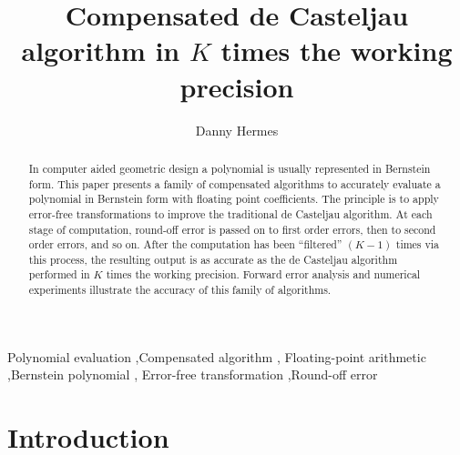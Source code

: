 \documentclass[3p, authoryear, square]{elsarticle}
\theoremstyle{definition}
\begin{document}
\hypersetup{
  urlcolor=MidnightBlue,
  linkcolor=MidnightBlue,
  citecolor=ForestGreen,
}

\begin{frontmatter}

\title{Compensated de Casteljau algorithm in \(K\) times the working precision}
\author[djh]{Danny Hermes}
\address[djh]{UC Berkeley, 970 Evans Hall \#3840, Berkeley, CA 94720-3840 USA}

\begin{abstract}
In computer aided geometric design a polynomial is usually represented in
Bernstein form. This paper presents a family of compensated algorithms to
accurately evaluate a polynomial in Bernstein form with floating point
coefficients. The principle is to apply error-free transformations to
improve the traditional de Casteljau algorithm. At each stage of computation,
round-off error is passed on to first order errors, then to second order
errors, and so on. After the computation has been ``filtered'' \((K - 1)\)
times via this process, the resulting output is as accurate as the de Casteljau
algorithm performed in \(K\) times the working precision. Forward error
analysis and numerical experiments illustrate the accuracy of this family
of algorithms.
\end{abstract}

\begin{keyword}
Polynomial evaluation \sep Compensated algorithm \sep
Floating-point arithmetic \sep Bernstein polynomial \sep
Error-free transformation \sep Round-off error
\end{keyword}

\end{frontmatter}

\section{Introduction}
\end{document}
